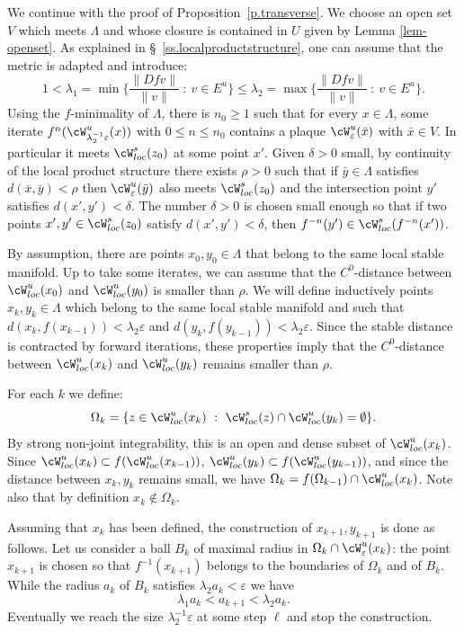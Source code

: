 \documentclass[a4paper,11pt]{amsart}
\numberwithin{equation}{section}     %
\theoremstyle{definition}
\theoremstyle{remark}
\newcommand{\eps}{\varepsilon}
\begin{document}
We continue with the proof of Proposition~\ref{p.transverse}. We choose an open set $V$ which meets $\Lambda$ and whose closure is contained in $U$ given by Lemma \ref{lem-openset}.
As explained in \S~\ref{ss.localproductstructure}, one can assume that the metric is adapted and introduce:
$$1< \lambda_1 = \min \bigg\{ \frac{\|Df v\|}{\|v\|} \ : \ v \in E^u \bigg\} \leq \lambda_2 =  \max \bigg\{ \frac{\|Df v\|}{\|v\|} \ : \ v \in E^u \bigg\}.$$
Using the $f$-minimality of $\Lambda$, there is $n_0\geq 1$ such that for every $x \in \Lambda$, some iterate $f^{n}(\cW^u_{\lambda_2^{-1}\eps}(x))$ with $0\leq n\leq n_0$ contains a plaque $\cW^u_\eps(\bar x)$ with $\bar x\in V$.
In particular it meets $\cW^s_{loc}(z_0)$ at some point $x'$. Given $\delta>0$ small, by continuity of the local product structure there exists $\rho>0$ such that if $\bar y\in \Lambda$ satisfies $d(\bar x,\bar y)<\rho$ then $\cW^u_\eps(\bar y)$ also meets
$\cW^s_{loc}(z_0)$ and the intersection point $y'$ satisfies $d(x',y')<\delta$.
The number $\delta>0$ is chosen small enough so that if two points $x',y'\in \cW^s_{loc}(z_0)$ satisfy $d(x',y')<\delta$,
then $f^{-n}(y')\in \cW^s_{loc}(f^{-n}(x'))$.

By assumption, there are points $x_0, y_0 \in \Lambda$ that belong to the same local stable manifold. Up to take some iterates, we can assume that the $C^0$-distance between $\cW^{u}_{loc}(x_0)$ and $\cW^{u}_{loc}(y_0)$ is smaller than $\rho$.
We will define inductively points $x_k,y_k\in\Lambda$ which belong to the same local stable manifold and such that
$d(x_k,f(x_{k-1}))<\lambda_2\eps$ and $d(y_k,f(y_{k-1}))<\lambda_2\eps$. Since the stable distance is contracted by forward iterations, these properties imply that the $C^0$-distance between $\cW^{u}_{loc}(x_k)$ and $\cW^{u}_{loc}(y_k)$ remains smaller than $\rho$.

For each $k$ we define: 
 $$ \Omega_k = \{z \in \cW^{u}_{loc}(x_k) \ : \ \cW^{s}_{loc}(z) \cap \cW^u_{loc}(y_k) = \emptyset \}. $$
By strong non-joint integrability, this is an open and dense subset of $ \cW^{u}_{loc}(x_k)$.
Since $\cW^u_{loc}(x_k)\subset f(\cW^u_{loc}(x_{k-1}))$, $\cW^u_{loc}(y_k)\subset f(\cW^u_{loc}(y_{k-1}))$,
and since the distance between $x_k,y_k$ remains small,
we have $\Omega_{k}=f(\Omega_{k-1})\cap \cW^u_{loc}(x_k)$. Note also that by definition $x_k\not\in \Omega_k$.

Assuming that $x_{k}$ has been defined, the construction of $x_{k+1},y_{k+1}$ is done as follows.
Let us consider a ball $B_{k}$ of maximal radius in $\Omega_{k} \cap \cW^u_{\eps}(x_{k})$:
the point $x_{k+1}$ is chosen so that $f^{-1}(x_{k+1})$ belongs to the boundaries of $\Omega_{k}$ and of $B_{k}$.
While the radius $a_{k}$ of $B_{k}$ satisfies $\lambda_2 a_{k} < \eps$ we have
$$\lambda_1 a_{k}<a_{k+1}<\lambda_2 a_{k}.$$
Eventually we reach the size $ \lambda^{-1}_2 \eps$ at some step $\ell$ and stop the construction.
\end{document}
